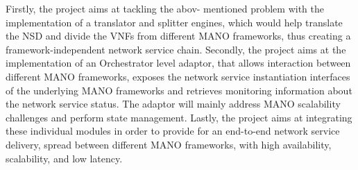 Firstly, the project aims at tackling the abov- mentioned problem with the implementation of a translator and splitter engines, which would help translate the NSD and divide the VNFs from different MANO frameworks, thus creating a framework-independent network service chain. Secondly, the project aims at the implementation of an Orchestrator level adaptor, that allows interaction between different MANO frameworks, exposes the network service instantiation interfaces of the underlying MANO frameworks and retrieves monitoring information about the network service status. The adaptor will mainly address MANO scalability challenges and perform state management. Lastly, the project aims at integrating these individual modules in order to provide for an end-to-end network service delivery, spread between different MANO frameworks, with high availability, scalability, and low latency.



